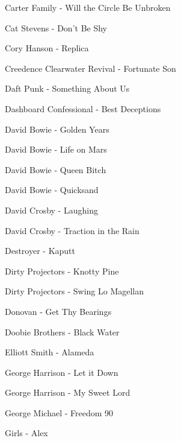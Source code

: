 Carter Family - Will the Circle Be Unbroken \dotfill \pageref{Will the Circle Be Unbroken - Carter Family} 

Cat Stevens - Don't Be Shy \dotfill \pageref{Don't Be Shy - Cat Stevens} 

Cory Hanson - Replica \dotfill \pageref{Replica - Cory Hanson} 

Creedence Clearwater Revival - Fortunate Son \dotfill \pageref{Fortunate Son - Creedence Clearwater Revival} 

Daft Punk - Something About Us \dotfill \pageref{Something About Us - Daft Punk} 

Dashboard Confessional - Best Deceptions \dotfill \pageref{Best Deceptions - Dashboard Confessional} 

David Bowie - Golden Years \dotfill \pageref{Golden Years - David Bowie} 

David Bowie - Life on Mars \dotfill \pageref{Life on Mars - David Bowie} 

David Bowie - Queen Bitch \dotfill \pageref{Queen Bitch - David Bowie} 

David Bowie - Quicksand \dotfill \pageref{Quicksand - David Bowie} 

David Crosby - Laughing \dotfill \pageref{Laughing - David Crosby} 

David Crosby - Traction in the Rain \dotfill \pageref{Traction in the Rain - David Crosby} 

Destroyer - Kaputt \dotfill \pageref{Kaputt - Destroyer} 

Dirty Projectors - Knotty Pine \dotfill \pageref{Knotty Pine - Dirty Projectors} 

Dirty Projectors - Swing Lo Magellan \dotfill \pageref{Swing Lo Magellan - Dirty Projectors} 

Donovan - Get Thy Bearings \dotfill \pageref{Get Thy Bearings - Donovan} 

Doobie Brothers - Black Water \dotfill \pageref{Black Water - Doobie Brothers} 

Elliott Smith - Alameda \dotfill \pageref{Alameda - Elliott Smith} 

George Harrison - Let it Down \dotfill \pageref{Let it Down - George Harrison} 

George Harrison - My Sweet Lord \dotfill \pageref{My Sweet Lord - George Harrison} 

George Michael - Freedom 90 \dotfill \pageref{Freedom 90 - George Michael} 

Girls - Alex \dotfill \pageref{Alex - Girls} 

